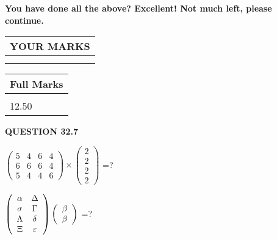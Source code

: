 \documentclass[12pt]{article}
\begin{document}
 
 

 

 
\vspace{0.3in}
   
   
\vspace{0.3in}
{\textbf{\LARGE{You have done all the above? Excellent! Not much left, please continue.}}}
\vspace{0.3in}
   
   
  
\vspace{0.2in}
  
\noindent\begin{tabular}{|l|}
\hline
 YOUR MARKS  \\
\hline
 \\ 
 \\ 
\hline
\end{tabular}
\hspace{0.05in} \begin{tabular}{|l|}
\hline
 Full Marks  \\
\hline
 \\ 
12.50 \\
\hline
\end{tabular}
{\textbf{\Large{QUESTION
32.7 
}}}
  
  
 
$ \left( \begin{array}{ccccccccc}
           5  & 
           4  & 
           6  & 
           4  \\ 
           6  & 
           6  & 
           6  & 
           4  \\ 
           5  & 
           4  & 
           4  & 
           6
\end{array}\right) \times
\left( \begin{array}{c}
           2  \\ 
           2  \\ 
           2  \\ 
           2
\end{array}\right) $ =?
 
 
$  %
 \left( \begin{array}
 {
 c
 c
 }
 \alpha & 
 \Delta \\ 
 \sigma & 
 \Gamma \\ 
 \Lambda & 
 \delta \\ 
                    \Xi & 
 \varepsilon
 \end{array} \right)
 \left( \begin{array}
 {
 c
 }
 \beta \\ 
 \beta
 \end{array} \right)
$ =?
 
\end{document}
